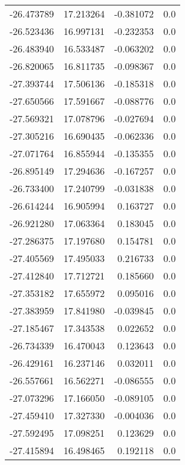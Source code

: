 \begin{tabular}{rrrr}
      -26.473789 &        17.213264 &   -0.381072 &   0.0 \\
      -26.523436 &        16.997131 &   -0.232353 &   0.0 \\
      -26.483940 &        16.533487 &   -0.063202 &   0.0 \\
      -26.820065 &        16.811735 &   -0.098367 &   0.0 \\
      -27.393744 &        17.506136 &   -0.185318 &   0.0 \\
      -27.650566 &        17.591667 &   -0.088776 &   0.0 \\
      -27.569321 &        17.078796 &   -0.027694 &   0.0 \\
      -27.305216 &        16.690435 &   -0.062336 &   0.0 \\
      -27.071764 &        16.855944 &   -0.135355 &   0.0 \\
      -26.895149 &        17.294636 &   -0.167257 &   0.0 \\
      -26.733400 &        17.240799 &   -0.031838 &   0.0 \\
      -26.614244 &        16.905994 &    0.163727 &   0.0 \\
      -26.921280 &        17.063364 &    0.183045 &   0.0 \\
      -27.286375 &        17.197680 &    0.154781 &   0.0 \\
      -27.405569 &        17.495033 &    0.216733 &   0.0 \\
      -27.412840 &        17.712721 &    0.185660 &   0.0 \\
      -27.353182 &        17.655972 &    0.095016 &   0.0 \\
      -27.383959 &        17.841980 &   -0.039845 &   0.0 \\
      -27.185467 &        17.343538 &    0.022652 &   0.0 \\
      -26.734339 &        16.470043 &    0.123643 &   0.0 \\
      -26.429161 &        16.237146 &    0.032011 &   0.0 \\
      -26.557661 &        16.562271 &   -0.086555 &   0.0 \\
      -27.073296 &        17.166050 &   -0.089105 &   0.0 \\
      -27.459410 &        17.327330 &   -0.004036 &   0.0 \\
      -27.592495 &        17.098251 &    0.123629 &   0.0 \\
      -27.415894 &        16.498465 &    0.192118 &   0.0 \\

\end{tabular}
